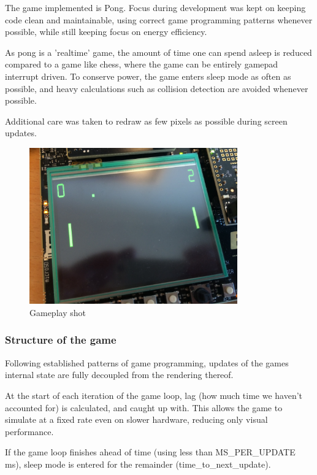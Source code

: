 The game implemented is Pong. Focus during development was kept on keeping code
clean and maintainable, using correct game programming patterns whenever
possible, while still keeping focus on energy efficiency.

As pong is a 'realtime' game, the amount of time one can spend asleep is
reduced compared to a game like chess, where the game can be entirely gamepad
interrupt driven.  To conserve power, the game enters sleep mode as often as
possible, and heavy calculations such as collision detection are avoided
whenever possible.

Additional care was taken to redraw as few pixels as possible during screen
updates.

\begin{figure}[H]
\centering
\includegraphics[width=0.8\textwidth]{figures/gameplay.jpg}
\caption{Gameplay shot}

\end{figure}

\subsubsection{Structure of the game}

Following established patterns of game programming, updates of the games
internal state are fully decoupled from the rendering thereof.

At the start of each iteration of the game loop, lag (how much time we haven't
accounted for) is calculated, and caught up with.  This allows the game to
simulate at a fixed rate even on slower hardware, reducing only visual
performance.

If the game loop finishes ahead of time (using less than MS\_PER\_UPDATE ms),
sleep mode is entered for the remainder (time\_to\_next\_update).

